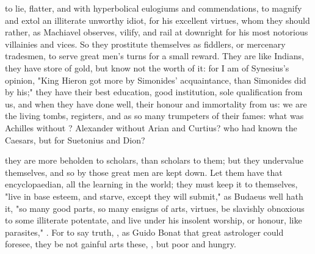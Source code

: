 to lie, flatter, and with hyperbolical eulogiums and commendations, to magnify
and extol an illiterate unworthy idiot, for his excellent virtues, whom they
should rather, as Machiavel observes, vilify, and rail at
downright for his most notorious villainies and vices. So they prostitute
themselves as fiddlers, or mercenary tradesmen, to serve great men's turns for
a small reward. They are like Indians, they have store of
gold, but know not the worth of it: for I am of Synesius's opinion,
"King Hieron got more by Simonides' acquaintance, than
Simonides did by his;" they have their best education, good institution, sole
qualification from us, and when they have done well, their honour and
immortality from us: we are the living tombs, registers, and as so many
trumpeters of their fames: what was Achilles without \Homer{}? Alexander without
Arian and Curtius? who had known the Caesars, but for Suetonius and Dion?

they are more beholden to scholars, than scholars to them; but they undervalue
themselves, and so by those great men are kept down. Let them have that
encyclopaedian, all the learning in the world; they must keep it to themselves,
"live in base esteem, and starve, except they will
submit," as Budaeus well hath it, "so many good parts, so many ensigns of arts,
virtues, be slavishly obnoxious to some illiterate potentate, and live under
his insolent worship, or honour, like parasites," . For to say truth, , as
Guido Bonat that great astrologer could foresee, they be not gainful arts
these, , but poor and hungry.

